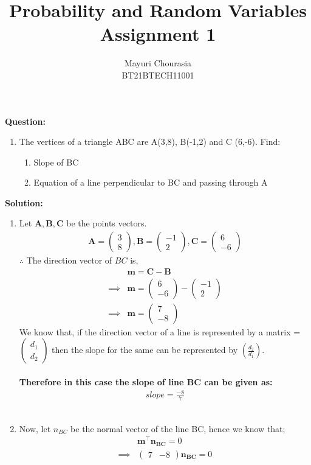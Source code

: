 \documentclass[journal,12pt,twocolumn]{IEEEtran}
\title{Probability and Random Variables\\Assignment 1}
\author{Mayuri Chourasia\\BT21BTECH11001}
\date{}
\let\vec\mathbf
\providecommand{\brak}[1]{\ensuremath{\left(#1\right)}}
\newcommand{\myvec}[1]{\ensuremath{\begin{pmatrix}#1\end{pmatrix}}}
\newcommand{\question}{\noindent \textbf{Question: }}
\newcommand{\solution}{\noindent \textbf{Solution: }}
\begin{document}
\maketitle
\question
\begin{enumerate}[label=]
\item The vertices of a triangle ABC are A(3,8), B(-1,2) and C (6,-6). Find:
\begin{enumerate}
    \item Slope of BC
    \item Equation of a line perpendicular to BC and passing through A
\end{enumerate}
\end{enumerate}
\solution
\begin{enumerate}
\item Let $\vec{A}, \vec{B}, \vec{C}$ be the points vectors.
	\begin{align}
		\vec{A} = \myvec{3 \\ 8} ,
		\vec{B} = \myvec{-1 \\ 2}  ,
		\vec{C} = \myvec{6 \\ -6}
	\end{align}
	$\therefore$ The direction vector of $BC$ is,
    \begin{align}
    &\vec{m} = \vec{C} - \vec{B}
    \\
	\implies &\vec{m} = \myvec{6 \\ -6} - \myvec{-1 \\ 2}
	\\
	\implies &\vec{m} = \myvec{7 \\ -8}
    \end{align}
    We know that, if the direction vector of a line is represented by a matrix \vec{m}=\myvec{d_1\\d_2} then the slope for the same can be represented by $\brak{\frac{d_2}{d_1}}$.\\
    \medskip\\
    \textbf{Therefore in this case the slope of line BC can be given as:}
    \begin{align}
        slope=\frac{-8}{7}
    \end{align}
    \medskip\\
\item Now, let $n_{BC}$ be the normal vector of the line BC, hence we know that;
    \begin{align}
	&\vec{m}^{\top}\vec{n_{BC}} = 0
	\\
	\implies &\myvec{7 & -8}\vec{n_{BC}} = 0
	\\

\end{align}
\end{enumerate}
\end{document}
